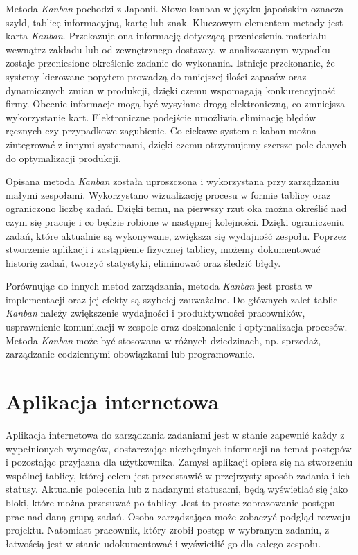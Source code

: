 \indent Metoda \textit{Kanban} pochodzi z Japonii. Słowo kanban w języku japońskim oznacza szyld, tablicę informacyjną, kartę lub znak.  Kluczowym elementem metody jest karta \textit{Kanban}. Przekazuje ona informację dotyczącą przeniesienia materiału wewnątrz zakładu lub od zewnętrznego dostawcy, w analizowanym wypadku zostaje przeniesione określenie zadanie do wykonania. Istnieje przekonanie, że systemy kierowane popytem prowadzą do mniejszej ilości zapasów oraz dynamicznych zmian w produkcji, dzięki czemu wspomagają konkurencyjność firmy. Obecnie informacje mogą być wysyłane drogą elektroniczną, co zmniejsza wykorzystanie kart. Elektroniczne podejście umożliwia eliminację błędów ręcznych czy przypadkowe zagubienie. Co ciekawe system e-kaban można zintegrować z innymi systemami, dzięki czemu otrzymujemy szersze pole danych do optymalizacji produkcji.


Opisana metoda \textit{Kanban} została uproszczona i wykorzystana przy zarządzaniu małymi zespołami. Wykorzystano wizualizację procesu w formie tablicy oraz ograniczono liczbę zadań. Dzięki temu, na pierwszy rzut oka można określić nad czym się pracuje i co będzie robione w następnej kolejności. Dzięki ograniczeniu zadań, które aktualnie są wykonywane, zwiększa się wydajność zespołu. Poprzez stworzenie aplikacji i zastąpienie fizycznej tablicy, możemy dokumentować historię zadań, tworzyć statystyki, eliminować oraz śledzić błędy.


Porównując do innych metod zarządzania, metoda \textit{Kanban} jest prosta w implementacji oraz jej efekty są szybciej zauważalne.  Do głównych zalet tablic \textit{Kanban} należy zwiększenie wydajności i produktywności pracowników, usprawnienie komunikacji w zespole oraz doskonalenie i optymalizacja procesów. Metoda \textit{Kanban} może być stosowana w różnych dziedzinach, np. sprzedaż, zarządzanie codziennymi obowiązkami lub programowanie.


\section{Aplikacja internetowa}

Aplikacja internetowa do zarządzania zadaniami jest w stanie zapewnić każdy z wypełnionych wymogów, dostarczając niezbędnych informacji na temat postępów i pozostając przyjazna dla użytkownika. Zamysł aplikacji opiera się na stworzeniu wspólnej tablicy, której celem jest przedstawić w przejrzysty sposób zadania i ich statusy. Aktualnie polecenia lub z nadanymi statusami, będą wyświetlać się jako bloki, które można przesuwać po tablicy. Jest to proste zobrazowanie postępu prac nad daną grupą zadań. Osoba zarządzająca może zobaczyć podgląd rozwoju projektu. Natomiast pracownik, który zrobił postęp w wybranym zadaniu, z łatwością jest w stanie udokumentować i wyświetlić go dla całego zespołu. 

